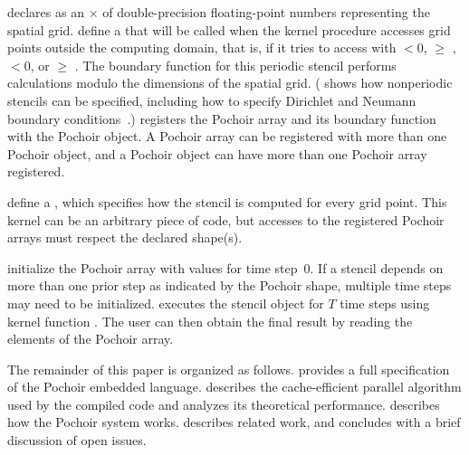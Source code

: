  declares  as an
$\times$  of double-precision
floating-point numbers representing the spatial grid.
 define a
 that will be called when the kernel procedure
accesses grid points outside the computing domain, that is, if it
tries to access  with  $<0$,  $\geq$
,  $<0$, or  $\geq$ .  The boundary
function for this periodic stencil performs calculations modulo the
dimensions of the spatial grid.  ( shows how nonperiodic
stencils can be specified, including how to specify Dirichlet and
Neumann boundary conditions~\cite{FeshbachMo81}.)
 registers the Pochoir array  and its
boundary function  with the  Pochoir object.
A Pochoir array can be registered with more than one Pochoir object,
and a Pochoir object can have more than one Pochoir array registered.

 define a  , which specifies how the stencil is
computed for every grid point.  This kernel can be an arbitrary piece
of code, but accesses to the registered Pochoir arrays must respect
the declared shape(s).

 initialize the Pochoir array
 with values for time step~$0$.  If a stencil depends on more
than one prior step as indicated by the Pochoir shape, multiple time
steps may need to be initialized.   executes the
stencil object  for $T$ time steps using kernel function
.  The user can then obtain the final result by reading
the elements  of the Pochoir array.

The remainder of this paper is organized as follows.  
provides a full specification of the Pochoir embedded language.
 describes the cache-efficient parallel algorithm used by
the compiled code and analyzes its theoretical performance.
 describes how the Pochoir system works.  
describes related work, and  concludes with a brief
discussion of open issues.


